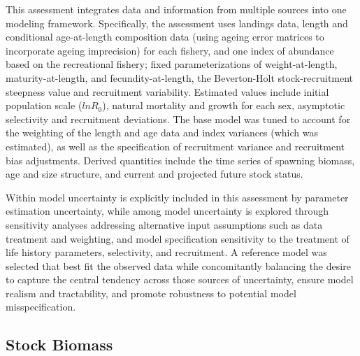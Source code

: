 \documentclass[11pt,
  english,
  a4paper,
]{article}
\begin{document}
\leavevmode\tagmcend\tagstructend\par


This assessment integrates data and information from multiple sources into one modeling framework. Specifically, the assessment uses landings data, length and conditional age-at-length composition data (using ageing error matrices to incorporate ageing imprecision) for each fishery, and one index of abundance based on the recreational fishery; fixed parameterizations of weight-at-length, maturity-at-length, and fecundity-at-length, the Beverton-Holt stock-recruitment steepness value and recruitment variability. Estimated values include initial population scale ({\(lnR_0\)\leavevmode\tagmcend\tagstructend}), natural mortality and growth for each sex, asymptotic selectivity and recruitment deviations. The base model was tuned to account for the weighting of the length and age data and index variances (which was estimated), as well as the specification of recruitment variance and recruitment bias adjustments. Derived quantities include the time series of spawning biomass, age and size structure, and current and projected future stock status.

\leavevmode\tagmcend\tagstructend\par


Within model uncertainty is explicitly included in this assessment by parameter estimation uncertainty, while among model uncertainty is explored through sensitivity analyses addressing alternative input assumptions such as data treatment and weighting, and model specification sensitivity to the treatment of life history parameters, selectivity, and recruitment. A reference model was selected that best fit the observed data while concomitantly balancing the desire to capture the central tendency across those sources of uncertainty, ensure model realism and tractability, and promote robustness to potential model misspecification.

\leavevmode\tagmcend\tagstructend\par


\hypertarget{stock-biomass}{%
\subsection*{Stock Biomass}\label{stock-biomass}}
\end{document}
